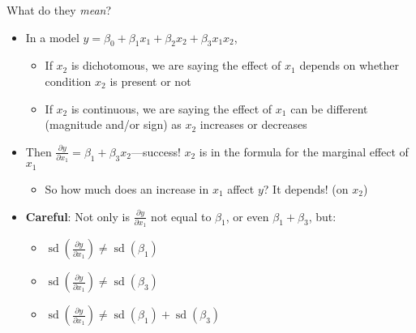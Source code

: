 \documentclass[
  ignorenonframetext,
]{beamer}
\providecommand{\tightlist}{%
  \setlength{\itemsep}{0pt}\setlength{\parskip}{0pt}}
\newcommand{\setsep}{\setlength{\itemsep}{3pt}}
\newcommand{\setskip}{\setlength{\parskip}{3pt}}
\renewcommand{\tightlist}{\setsep\setskip}
\begin{document}
\begin{frame}{What do they \emph{mean}?}
\protect\hypertarget{what-do-they-mean}{}
\pause

\begin{itemize}[<+->]
\tightlist
\item
  In a model \(y = \beta_0 + \beta_1 x_1 + \beta_2 x_2 + \beta_3 x_1 x_2\),

  \begin{itemize}[<+->]
  \tightlist
  \item
    If \(x_2\) is dichotomous, we are saying the effect of \(x_1\) depends on whether condition \(x_2\) is present or not
  \item
    If \(x_2\) is continuous, we are saying the effect of \(x_1\) can be different (magnitude and/or sign) as \(x_2\) increases or decreases
  \end{itemize}
\item
  Then \(\ensuremath{\frac{\partial{y}}{\partial{x_1}}} = \beta_1 + \beta_3 x_2\)---success! \(x_2\) is in the formula for the marginal effect of \(x_1\)

  \begin{itemize}[<+->]
  \tightlist
  \item
    So how much does an increase in \(x_1\) affect \(y\)? It depends! (on \(x_2\))
  \end{itemize}
\item
  \textbf{Careful}: Not only is \(\ensuremath{\frac{\partial{y}}{\partial{x_1}}}\) not equal to \(\beta_1\), or even \(\beta_1 + \beta_3\), but:

  \begin{itemize}[<+->]
  \tightlist
  \item
    \(\mathop{\mathrm{sd}}\left( \ensuremath{\frac{\partial{y}}{\partial{x_1}}} \right) \neq \mathop{\mathrm{sd}}\left( \beta_1 \right)\)
  \item
    \(\mathop{\mathrm{sd}}\left( \ensuremath{\frac{\partial{y}}{\partial{x_1}}} \right) \neq \mathop{\mathrm{sd}}\left( \beta_3 \right)\)
  \item
    \(\mathop{\mathrm{sd}}\left( \ensuremath{\frac{\partial{y}}{\partial{x_1}}} \right) \neq \mathop{\mathrm{sd}}\left( \beta_1 \right) + \mathop{\mathrm{sd}}\left( \beta_3 \right)\)
  \end{itemize}
\end{itemize}
\end{frame}
\end{document}
